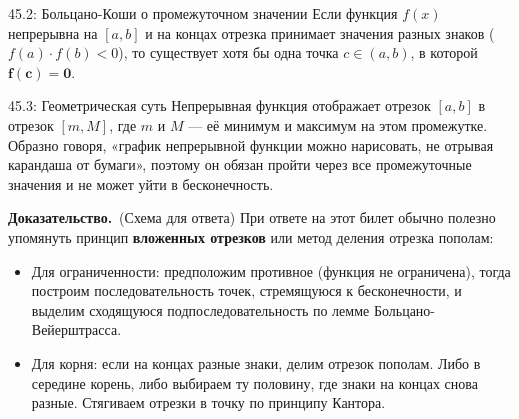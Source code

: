 \documentclass[a4paper,12pt]{article}
\newcommand{\myproof}{\textbf{Доказательство.}\ }
\begin{document}
	\begin{theorembox}{45.2: Больцано-Коши о промежуточном значении}
		Если функция $f(x)$ непрерывна на $[a, b]$ и на концах отрезка принимает значения разных знаков ($f(a) \cdot f(b) < 0$), то существует хотя бы одна точка $c \in (a, b)$, в которой $\mathbf{f(c) = 0}$.
	\end{theorembox}
	
	
	\begin{center}
	\end{center}
	
	\begin{notebook}{45.3: Геометрическая суть}
		Непрерывная функция отображает отрезок $[a, b]$ в отрезок $[m, M]$, где $m$ и $M$ — её минимум и максимум на этом промежутке. Образно говоря, «график непрерывной функции можно нарисовать, не отрывая карандаша от бумаги», поэтому он обязан пройти через все промежуточные значения и не может уйти в бесконечность.
	\end{notebook}
	
	\myproof (Схема для ответа)
	При ответе на этот билет обычно полезно упомянуть принцип \textbf{вложенных отрезков} или метод деления отрезка пополам:
	\begin{itemize}
		\item Для ограниченности: предположим противное (функция не ограничена), тогда построим последовательность точек, стремящуюся к бесконечности, и выделим сходящуюся подпоследовательность по лемме Больцано-Вейерштрасса.
		\item Для корня: если на концах разные знаки, делим отрезок пополам. Либо в середине корень, либо выбираем ту половину, где знаки на концах снова разные. Стягиваем отрезки в точку по принципу Кантора.
	\end{itemize}
	
\end{document}

